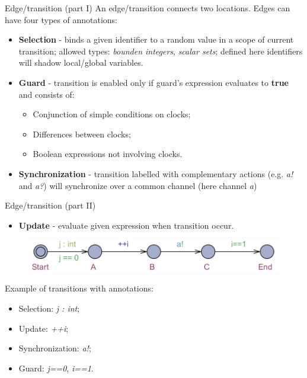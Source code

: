\documentclass{beamer}
\begin{document}
\begin{frame}{Edge/transition (part I)}
	An edge/transition connects two locations. Edges can have four types of annotations:
	
	\begin{itemize}
		\item \textbf{Selection} - binds a given identifier to a random value in a scope of current transition; allowed types: \textit{bounden integers}, \textit{scalar sets}; defined here identifiers will shadow local/global variables.
		\item \textbf{Guard} - transition is enabled only if guard's expression evaluates to \textbf{true} and consists of:
		\begin{itemize}
			\item Conjunction of simple conditions on clocks;
			\item Differences between clocks;
			\item Boolean expressions not involving clocks.
		\end{itemize}
		\item \textbf{Synchronization} - transition labelled with complementary actions (e.g. \textit{a!} and \textit{a?}) will synchronize over a common channel (here channel \textit{a})
	\end{itemize}

\end{frame}

\begin{frame}{Edge/transition (part II)}
	\begin{itemize}
		\item \textbf{Update} - evaluate given expression when transition occur.
	\end{itemize}	
	
	\begin{figure}[H]
		\includegraphics[scale=0.8]{img/uppaal_transitions.png}
	\end{figure}
	Example of transitions with annotations:
	\begin{itemize}
		\item Selection: \textit{j : int};
		\item Update: \textit{++i};
		\item Synchronization: \textit{a!};
		\item Guard: \textit{j==0}, \textit{i==1}.
	\end{itemize}
\end{frame}
\end{document}
